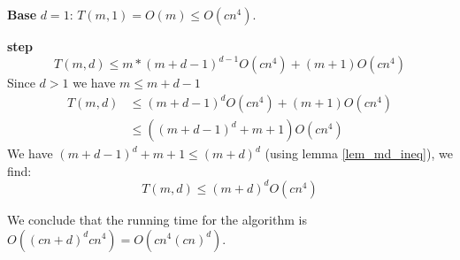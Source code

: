 \textbf{Base} $d = 1$: $T(m,1) = O(m) \leq O(cn^4)$.

\textbf{step} 
\[ T(m,d) \leq m*(m+d-1)^{d-1}O(cn^4) + (m+1)O(cn^4) \]
Since $d > 1$ we have $m \leq m+d-1$
\begin{align*}
T(m,d) &\leq (m+d-1)^{d}O(cn^4) + (m+1)O(cn^4)\\
& \leq ((m+d-1)^d + m + 1)O(cn^4)
\end{align*}
We have $(m+d-1)^d + m + 1 \leq (m+d)^d$ (using lemma \ref{lem_md_ineq}), we find:\\
\[ T(m,d) \leq (m+d)^dO(cn^4) \]

We conclude that the running time for the algorithm is $O((cn+d)^dcn^4) = O(cn^4(cn)^d)$.